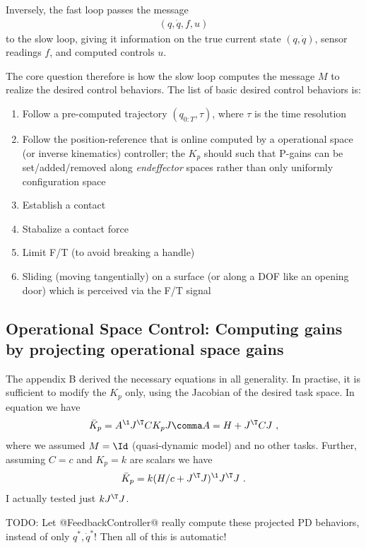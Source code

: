 \documentclass[10pt,fleqn,twoside]{article}
\begin{document}
{{Inversely, the fast loop passes the message
\begin{align}
(q, \dot q, f, u)
\end{align}
to the slow loop, giving it information on the true current state
 $(q, \dot q)$, sensor readings $f$, and computed controls $u$.

The core question therefore is how the slow loop computes the message
$M$ to realize the desired control behaviors. The list of basic desired
control behaviors is:
\begin{enumerate}
\item Follow a pre-computed trajectory $(q_{0:T},\tau)$, where $\tau$
is the time resolution
\item Follow the position-reference that is online computed by a
operational space (or inverse kinematics) controller; the $K_p$ should
such that P-gains can be set/added/removed along \emph{endeffector}
spaces rather than only uniformly configuration space
\item Establish a contact
\item Stabalize a contact force
\item Limit F/T (to avoid breaking a handle)
\item Sliding (moving tangentially) on a surface (or along a DOF like
  an opening door) which is perceived via the F/T signal
\end{enumerate}


\subsection{Operational Space Control: Computing gains by projecting
operational space gains}

The appendix B derived the necessary equations in all generality. In
practise, it is sufficient to modify the $K_p$ only, using the
Jacobian of the desired task space. In equation  we have
\begin{align}
\bar K_p = A^\1 J^\T C K_p J \comma A = H + J^\T C J ~,
\end{align}
where we assumed $M=\Id$ (quasi-dynamic model) and no other
tasks. Further, assuming $C=c$ and $K_p=k$ are scalars we have
\begin{align}
\bar K_p = k(H/c+J^\T J)^\1 J^\T J ~.
\end{align}
I actually tested just $k J^\T J$.

TODO: Let @FeedbackController@ really compute these projected PD
behaviors, instead of only $q^*,\dot q^*$! Then all of this is
automatic!



}}
\end{document}
